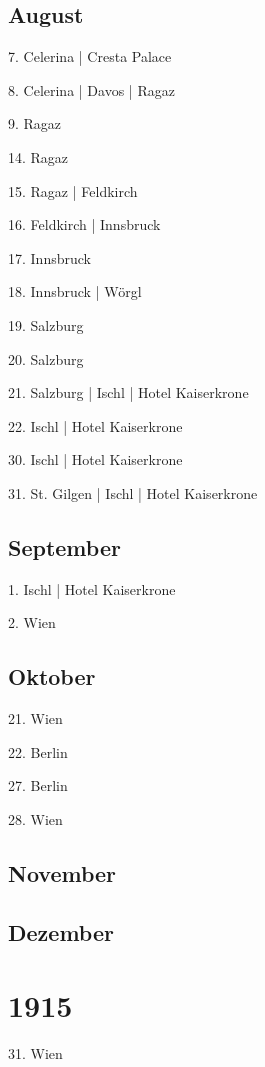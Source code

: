\documentclass[twoside=false,titlepage=false,open=any, parskip=never, fontsize=10pt, headings=small, chapterprefix=false, appendixprefix=false, DIV=15]{scrbook}
\begin{document}
\begin{multicols}{3}
            \section*{August}
            7. Celerina | Cresta Palace\par
            8. Celerina | Davos | Ragaz\par
            9. Ragaz\par
            14. Ragaz\par
            15. Ragaz | Feldkirch\par
            16. Feldkirch | Innsbruck\par
            17. Innsbruck\par
            18. Innsbruck | Wörgl\par
            19. Salzburg\par
            20. Salzburg\par
            21. Salzburg | Ischl | Hotel Kaiserkrone\par
            22. Ischl | Hotel Kaiserkrone\par
            30. Ischl | Hotel Kaiserkrone\par
            31. St. Gilgen | Ischl | Hotel Kaiserkrone\par
            \section*{September}
            1. Ischl | Hotel Kaiserkrone\par
            2. Wien\par
            \section*{Oktober}
            21. Wien\par
            22. Berlin\par
            27. Berlin\par
            28. Wien\par
            \section*{November}
            \section*{Dezember}
            \chapter*{1915}
            31. Wien\par

\end{multicols}
\end{document}
